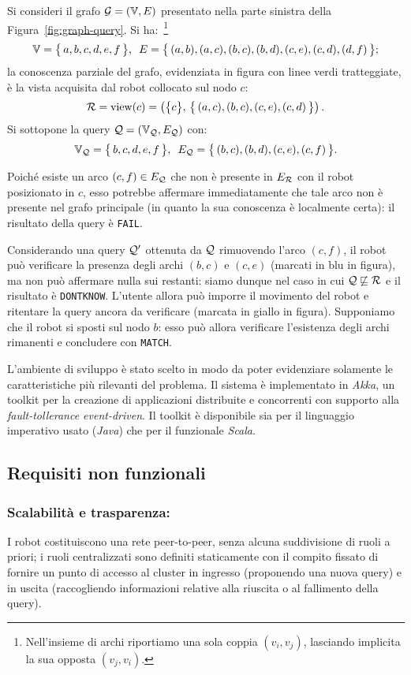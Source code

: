 \begin{example}
Si consideri il grafo $\mathcal{G} = (\mathbb{V}, E)$ presentato nella parte sinistra
della Figura~\ref{fig:graph-query}. Si ha:~\footnote{Nell'insieme di archi
riportiamo una sola coppia $(v_i, v_j)$, lasciando implicita la sua
opposta $(v_j, v_i)$.}
\[
\mathbb{V} = \bigl\{\,a, b, c, d, e, f\,\bigr\}, \ \,
E = \bigl\{\,(a,b),(a,c),(b,c),(b,d),(c,e),(c,d),(d,f)\,\bigr\};
\]
la conoscenza parziale del grafo,
evidenziata in figura con linee verdi tratteggiate,
è la vista acquisita dal robot collocato
sul nodo $c$: \[
\mathcal{R} = \mathrm{view}(c) = \left(\bigl\{c\bigr\},\,
\bigl\{\,(a,c), (b,c), (c,e), (c,d)\,\bigr\}\right). \]
Si sottopone la query $\mathcal{Q} = (\mathbb{V}_{\mathcal{Q}}, E_{\mathcal{Q}})$ con:\[
\mathbb{V}_{\mathcal{Q}} = \bigl\{\,b, c, d, e, f\,\bigr\}, \ \,
E_{\mathcal{Q}} = \bigl\{\,(b,c),(b,d),(c,e),(c,f)\,\bigr\}. \]

Poiché esiste un arco $(c,f) \in E_{\mathcal{Q}}$ che non è presente in $E_{\mathcal{R}}$
con il robot posizionato in $c$, esso potrebbe affermare immediatamente
che tale arco non è presente nel grafo principale
(in quanto la sua conoscenza è localmente certa): il risultato della query
è \texttt{FAIL}.

Considerando una query $\mathcal{Q}'$ ottenuta da $\mathcal{Q}$ rimuovendo l'arco
$(c, f)$, il robot può verificare la presenza degli archi $(b,c)$ e $(c,e)$
(marcati in blu in figura), ma non può affermare nulla sui restanti:
siamo dunque nel caso in cui $\mathcal{Q} \not\sqsubseteq \mathcal{R}$ e il risultato
è \texttt{DONTKNOW}.
L'utente allora può imporre il movimento del robot e ritentare
la query ancora da verificare (marcata in giallo in figura).
Supponiamo che il robot si sposti sul nodo $b$: esso può allora verificare
l'esistenza degli archi rimanenti e concludere con \texttt{MATCH}.
\end{example}

L'ambiente di sviluppo è stato scelto in modo da poter
evidenziare solamente le caratteristiche più rilevanti del problema.
Il sistema è implementato in \emph{Akka}, un toolkit per
la creazione di applicazioni distribuite e concorrenti con supporto
alla \emph{fault-tollerance event-driven}.
Il toolkit è disponibile sia per il linguaggio imperativo usato (\emph{Java})
che per il funzionale \emph{Scala}.

\subsection{Requisiti non funzionali}
\label{sec:nonfunc-req}

\subsubsection*{Scalabilità e trasparenza:}
I robot costituiscono una rete peer-to-peer,
senza alcuna suddivisione di ruoli a priori; i ruoli centralizzati
sono definiti staticamente con il compito fissato di fornire un punto
di accesso al cluster in ingresso (proponendo una nuova query) e
in uscita (raccogliendo informazioni relative alla riuscita
o al fallimento della query).

